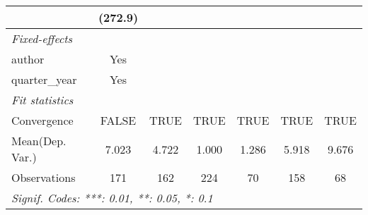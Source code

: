 \begin{tabular}{lcccccc}
                                     & (272.9)      &      &      &      &      &   \\   
   \midrule
   \emph{Fixed-effects}\\
   author                            & Yes          &      &      &      &      & \\  
   quarter\_year                     & Yes          &      &      &      &      & \\  
   \midrule
   \emph{Fit statistics}\\
   Convergence                       &FALSE         & TRUE & TRUE & TRUE & TRUE & TRUE\\  
Mean(Dep. Var.) & 7.023 & 4.722 & 1.000 & 1.286 & 5.918 & 9.676 \\
   Observations                      & 171          & 162  & 224  & 70   & 158  & 68\\  
   \midrule \midrule
   \multicolumn{7}{l}{\emph{Signif. Codes: ***: 0.01, **: 0.05, *: 0.1}}\\
\end{tabular}
\par\endgroup
